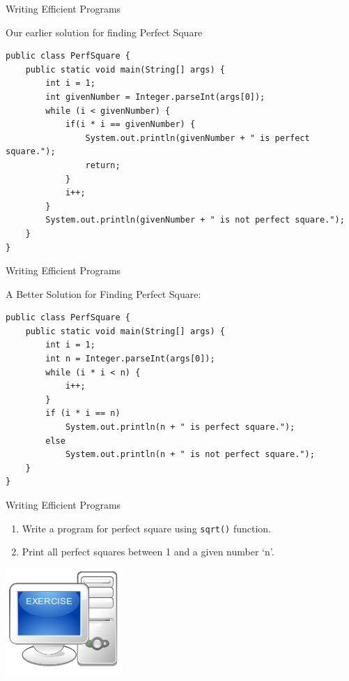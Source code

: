 \documentclass[14pt]{beamer}
\begin{document}
\begin{frame}[fragile]{Writing Efficient Programs}
 \begin{block}{Our earlier solution for finding Perfect Square}
  \begin{lstlisting}[numbers=none]
public class PerfSquare {
    public static void main(String[] args) {
        int i = 1;
        int givenNumber = Integer.parseInt(args[0]);
        while (i < givenNumber) {
            if(i * i == givenNumber) { 
                System.out.println(givenNumber + " is perfect square.");
                return;
            }
            i++; 
        }
        System.out.println(givenNumber + " is not perfect square.");
    }
}
\end{lstlisting}

 \end{block}
\end{frame}

\begin{frame}[fragile]{Writing Efficient Programs}
 \begin{block}{A Better Solution for Finding Perfect Square:}
  \begin{lstlisting}[numbers=none]
public class PerfSquare {
    public static void main(String[] args) {
        int i = 1;
        int n = Integer.parseInt(args[0]);
        while (i * i < n) {
            i++;
        }
        if (i * i == n)
            System.out.println(n + " is perfect square.");
        else
            System.out.println(n + " is not perfect square.");
    }
} 
\end{lstlisting}

 \end{block}
\end{frame}

\begin{frame}{Writing Efficient Programs}
 \begin{minipage}{8cm}
 \begin{enumerate}
  \item Write a program for perfect square using \lstinline!sqrt()! function.

  
  \item Print all perfect squares between 1 and a given number `n'.
  \end{enumerate}
 \end{minipage}
 \quad
 \begin{minipage}{2cm}
  \includegraphics[scale=.4]{exercise.png}
 \end{minipage}
\end{frame}
\end{document}
